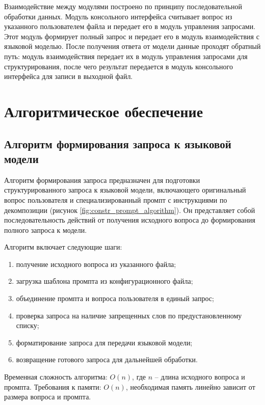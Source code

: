 Взаимодействие между модулями построено по принципу последовательной обработки данных. Модуль консольного интерфейса считывает вопрос из указанного пользователем файла и передает его в модуль управления запросами. Этот модуль формирует полный запрос и передает его в модуль взаимодействия с языковой моделью. После получения ответа от модели данные проходят обратный путь: модуль взаимодействия передает их в модуль управления запросами для структурирования, после чего результат передается в модуль консольного интерфейса для записи в выходной файл.

\section{Алгоритмическое обеспечение}



\subsection{Алгоритм формирования запроса к языковой модели}

Алгоритм формирования запроса предназначен для подготовки структурированного запроса к языковой модели, включающего оригинальный вопрос пользователя и специализированный промпт с инструкциями по декомпозиции (рисунок \ref{fig:constr_prompt_algorithm}). Он представляет собой последовательность действий от получения исходного вопроса до формирования полного запроса к модели. 

Алгоритм включает следующие шаги:
\begin{enumerate}
	\item получение исходного вопроса из указанного файла;
	\item загрузка шаблона промпта из конфигурационного файла;
	\item объединение промпта и вопроса пользователя в единый запрос;
	\item проверка запроса на наличие запрещенных слов по предустановленному списку;
	\item форматирование запроса для передачи языковой модели;
	\item возвращение готового запроса для дальнейшей обработки.
\end{enumerate}

Временная сложность алгоритма: $O(n)$, где $n$ -- длина исходного вопроса и промпта.
Требования к памяти: $O(n)$, необходимая память линейно зависит от размера вопроса и промпта.

